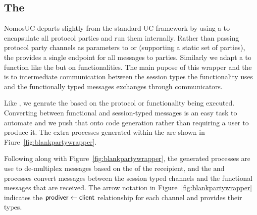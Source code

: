 
\subsection{The \partywrapper}
NomosUC departs slightly from the standard UC framework by using a \partywrapper to encapsulate all protocol parties and run them internally.
Rather than passing protocol party channels as parameters to \Z or \A (supporting a static set of parties), the \partywrapper provides a single endpoint for all messages to parties.
Similarly we adapt a \fwrapper to function like the \partywrapper but on functionalities. The main pupose of this wrapper and the \partywrapper is to intermediate communication between the session types the functionality uses and the functionally typed messages exchanges through communicators.

Like \iexecuc, we genrate the \partywrapper based on the protocol or functionality being executed. 
Converting between functional and session-typed messages is an easy task to automate and we push that onto code generation rather than requiring a user to produce it.
The extra processes generated within the \partywrapper are shown in Fiure~\ref{fig:blankpartywrapper}.

Following along with Figure~\ref{fig:blankpartywrapper}, the generated processes  are use to de-multiplex messages based on the  of the receipient, and the  and  processes convert messages between the session typed channels and the functional messages that are received.
The arrow notation in Figure~\ref{fig:blankpartywrapper} indicates the $\mathsf{prodiver} \leftarrow \mathsf{client}$ relationship for each channel and provides their types.


